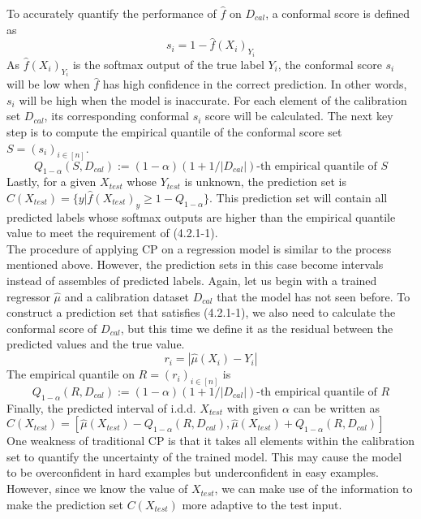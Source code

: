 \noindent To accurately quantify the performance of $\hat{f}$ on $D_{cal}$, a conformal score is defined as 
\begin{equation} 
s_i = 1-\hat{f}(X_i)_{Y_i}\tag{4.2.1-2}
\end{equation}
As $\hat{f}(X_i)_{Y_i}$ is the softmax output of the true label $Y_i$, the conformal score $s_i$ will be low when $\hat{f}$ has high confidence in the correct prediction. In other words, $s_i$ will be high when the model is inaccurate. For each element of the calibration set $D_{cal}$, its corresponding conformal $s_i$ score will be calculated. The next key step is to compute the empirical quantile of the conformal score set $S = (s_i)_{i\in[n]}$.
 \begin{equation} 
Q_{1-\alpha}(S,D_{cal}):=(1-\alpha)(1+1/|D_{cal}|)\text{-th empirical quantile of }S \tag{4.2.1-3}
 \end{equation} 
Lastly, for a given $X_{test}$ whose $Y_{test}$ is unknown, the prediction set is $C(X_{test})=\{y|\hat{f}(X_{test})_y\ge 1-Q_{1-\alpha}\}$.  This prediction set will contain all predicted labels whose softmax outputs are higher than the empirical quantile value to meet the requirement of (4.2.1-1).\\

\noindent The procedure of applying CP on a regression model is similar to the process mentioned above. However, the prediction sets in this case become intervals instead of assembles of predicted labels. Again, let us begin with a trained regressor $\hat{\mu}$ and a calibration dataset $D_{cal}$ that the model has not seen before.  To construct a prediction set that satisfies (4.2.1-1), we also need to calculate the conformal score of $D_{cal}$, but this time we define it as the residual between the predicted values and the true value.
\begin{equation} 
r_i = |\hat{\mu}(X_i)-Y_i|\tag{4.2.1-4}
\end{equation}
The empirical quantile on $R = (r_i)_{i\in[n]}$ is
 \begin{equation} 
Q_{1-\alpha}(R,D_{cal}):=(1-\alpha)(1+1/|D_{cal}|)\text{-th empirical quantile of }R \tag{4.2.1-5}
 \end{equation} 
Finally, the predicted interval of i.d.d. $X_{test}$ with given $\alpha$ can be written as $C(X_{test})=[\hat{\mu}(X_{test})-Q_{1-\alpha}(R,D_{cal}),\hat{\mu}(X_{test})+Q_{1-\alpha}(R,D_{cal})]$\\

\noindent One weakness of traditional CP is that it takes all elements within the calibration set to quantify the uncertainty of the trained model. This may cause the model to be overconfident in hard examples but underconfident in easy examples.  However, since we know the value of $X_{test}$, we can make use of the information to make the prediction set $C(X_{test})$ more adaptive to the test input. \\

